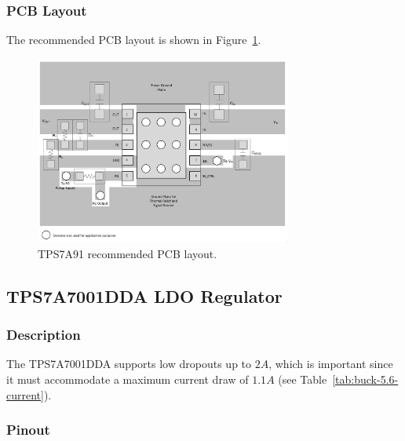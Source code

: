 \subsubsection{PCB Layout}
\label{sec:tps7a91-pcb}

The recommended PCB layout is shown in Figure~\ref{fig:tps7a91-pcb}.

\begin{figure}[h]
        \centering
        \includegraphics[width=0.75\textwidth]{data/tps7a91-pcb}
        \caption{TPS7A91 recommended PCB layout.}
        \label{fig:tps7a91-pcb}
\end{figure}

\subsection{TPS7A7001DDA LDO Regulator}
\label{sec:tps7a7001dda}

\subsubsection{Description}
\label{sec:tps7a7001dda-description}

The TPS7A7001DDA supports low dropouts up to $2 \si{A}$, which is important since it must
accommodate a maximum current draw of $1.1 \si{A}$ (see Table~\ref{tab:buck-5.6-current}).

\subsubsection{Pinout}
\label{sec:tps7a7001dda-pinout}

